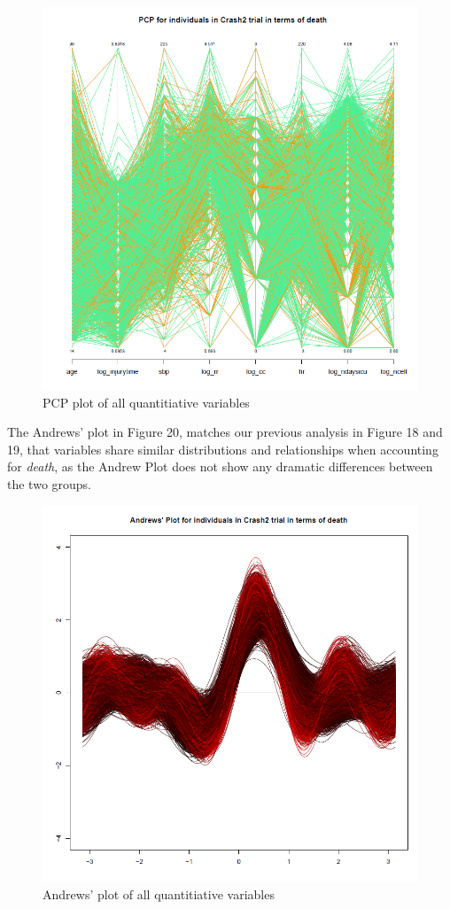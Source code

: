 \documentclass[
]{article}
\begin{document}
\newpage

\begin{figure}
\centering
\includegraphics{../figure_output/pcp_death.png}
\caption{PCP plot of all quantitiative variables}
\end{figure}

\newpage

The Andrews' plot in Figure 20, matches our previous analysis in Figure
18 and 19, that variables share similar distributions and relationships
when accounting for \emph{death}, as the Andrew Plot does not show any
dramatic differences between the two groups.

\begin{figure}
\centering
\includegraphics{../figure_output/andrew_death.png}
\caption{Andrews' plot of all quantitiative variables}
\end{figure}
\end{document}
